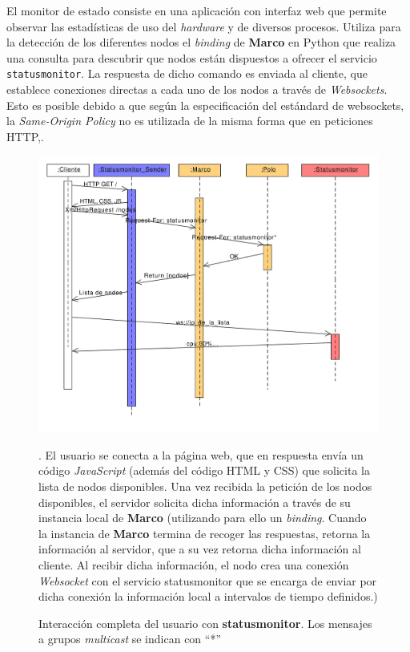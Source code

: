 El monitor de estado consiste en una aplicación con interfaz web que permite observar las estadísticas de uso del \textit{hardware} y de diversos procesos. Utiliza para la detección de los diferentes nodos el \textit{binding} de \textbf{Marco} en Python que realiza una consulta para descubrir que nodos están dispuestos a ofrecer el servicio \texttt{statusmonitor}. La respuesta de dicho comando es enviada al cliente, que establece conexiones directas a cada uno de los nodos a través de \textit{Websockets}\citationneeded. Esto es posible debido a que según la especificación del estándard de websockets, la \textit{Same-Origin Policy}\cite{rfc6455} no es utilizada de la misma forma que en peticiones HTTP,\cite{rfc6454}.

\begin{figure}[H]
\centering
\includegraphics[width=\textwidth]{Diagrams/Sequence/statusmonitor}
\caption{Interacción completa del usuario con \textbf{statusmonitor}. Los mensajes a grupos \textit{multicast} se indican con ``*''}. El usuario se conecta a la página web, que en respuesta envía un código \textit{JavaScript} (además del código HTML y CSS) que solicita la lista de nodos disponibles. Una vez recibida la petición de los nodos disponibles, el servidor solicita dicha información a través de su instancia local de \textbf{Marco} (utilizando para ello un \textit{binding}. Cuando la instancia de \textbf{Marco} termina de recoger las respuestas, retorna la información al servidor, que a su vez retorna dicha información al cliente. Al recibir dicha información, el nodo crea una conexión \textit{Websocket} con el servicio statusmonitor que se encarga de enviar por dicha conexión la información local a intervalos de tiempo definidos.)
\label{fig:secuencia_statusmonitor}
\end{figure}

